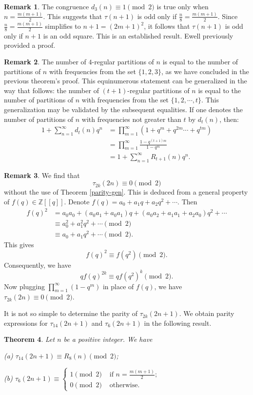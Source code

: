 \documentclass[10pt]{article}
\newtheorem{theorem}{Theorem}[section]
\theoremstyle{definition}
\newtheorem{remark}[theorem]{Remark}
\begin{document}
\begin{remark}
The congruence $d_3(n)\equiv 1\pmod 2$ is true only when $n=\frac{m(m+1)}{2}$. This suggests that $\tau(n+1)$ is odd only if $\frac{n}{8}=\frac{m(m+1)}{2}$. Since $\frac{n}{8}=\frac{m(m+1)}{2}$ simplifies to $n+1=(2m+1)^2$, it follows that $\tau(n+1)$ is odd only if $n+1$ is an odd square. This is an established result. Ewell \cite{ewell-1} previously provided a proof.
\end{remark}
\begin{remark}
The number of $4$-regular partitions of $n$ is equal to the number of partitions of $n$ with frequencies from the set $\{1,2,3\}$, as we have concluded in the previous theorem's proof. This equinumerous statement can be generalized in the way that follows: the number of $(t+1)$-regular partitions of $n$ is equal to the number of partitions of $n$ with frequencies from the set $\{1,2,\cdots, t\}$. This generalization may be validated by the subsequent equalities. If one denotes the number of partitions of $n$ with frequencies not greater than $t$ by $d_t(n)$, then:
\begin{align*}
1+\sum_{n=1}^{\infty} d_t(n)q^n&=\prod_{m=1}^{\infty}(1+q^m+q^{2m}\cdots+ q^{tm})\\
&=\prod_{m=1}^{\infty}\frac{1-q^{(t+1)m}}{1-q^m}\\
&=1+\sum_{n=1}^{\infty}R_{t+1}(n)q^n.
\end{align*}
\end{remark}
\begin{remark}
 We find that $$\tau_{2k}(2n)\equiv 0\pmod{2}$$ without the use of Theorem \ref{parity-gen}. This is deduced from a general property of $f(q)\in\mathbb{Z}[[q]]$. Denote $f(q)=a_0+a_1q+a_2q^2+\cdots $. Then \begin{align*}
f(q)^2&=a_0a_0+(a_0a_1+a_0a_1)q+(a_0a_2+a_1a_1+a_2a_0)q^2+\cdots \\
&\equiv a_0^2+a_1^2 q^2+\cdots \pmod{2}\\
&\equiv a_0+a_1q^2+\cdots \pmod{2}.
\end{align*}
This gives 
\[f(q)^2\equiv f(q^2)\pmod{2}.
\]
Consequently, we have
\[qf(q)^{2k}\equiv qf(q^2)^{k}\pmod{2}.
\]
Now plugging $\prod\limits_{m=1}^{\infty}(1-q^m)$ in place of $f(q)$, we have $\tau_{2k}(2n)\equiv 0\pmod{2}$.
\end{remark}
It is not so simple to determine the parity of $\tau_{2k}(2n+1)$. We obtain parity expressions for $\tau_{14}(2n+1)$ and $\tau_{6}(2n+1)$ in the following result.
\begin{theorem}
Let $n$ be a positive integer. We have
\begin{description}
\item{(a)} $\tau_{14}(2n+1)\equiv R_8(n)\pmod{2}$;
\item{(b)} $\tau_6(2n+1)\equiv\begin{cases}1\pmod{2}&{\text { if }n=\frac{m(m+1)}{2}};\\ 0\pmod{2}&{\text{ otherwise}}.\end{cases}$
\end{description}
\end{theorem}
\end{document}
